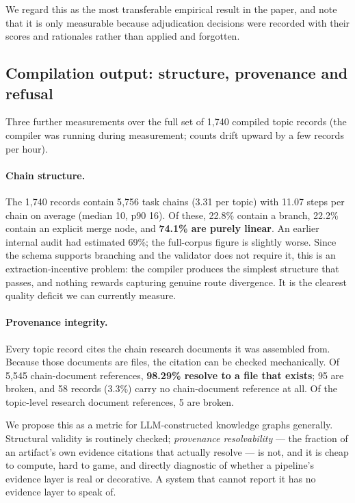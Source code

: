 \documentclass[10pt,a4paper]{article}
\begin{document}
We regard this as the most transferable empirical result in the paper, and note
that it is only measurable because adjudication decisions were recorded with
their scores and rationales rather than applied and forgotten.

\subsection{Compilation output: structure, provenance and refusal}
\label{sec:outputmeasure}

Three further measurements over the full set of 1{,}740 compiled topic records
(the compiler was running during measurement; counts drift upward by a few
records per hour).

\paragraph{Chain structure.} The 1{,}740 records contain 5{,}756 task chains
(3.31 per topic) with 11.07 steps per chain on average (median 10, p90 16). Of
these, 22.8\% contain a branch, 22.2\% contain an explicit merge node, and
\textbf{74.1\% are purely linear}. An earlier internal audit had estimated 69\%;
the full-corpus figure is slightly worse. Since the schema supports branching and
the validator does not require it, this is an extraction-incentive problem: the
compiler produces the simplest structure that passes, and nothing rewards
capturing genuine route divergence. It is the clearest quality deficit we can
currently measure.

\paragraph{Provenance integrity.} Every topic record cites the chain research
documents it was assembled from. Because those documents are files, the citation
can be checked mechanically. Of 5{,}545 chain-document references, \textbf{98.29\%
resolve to a file that exists}; 95 are broken, and 58 records (3.3\%) carry no
chain-document reference at all. Of the topic-level research document references,
5 are broken.

We propose this as a metric for LLM-constructed knowledge graphs generally.
Structural validity is routinely checked; \emph{provenance resolvability} --- the
fraction of an artifact's own evidence citations that actually resolve --- is not,
and it is cheap to compute, hard to game, and directly diagnostic of whether a
pipeline's evidence layer is real or decorative. A system that cannot report it
has no evidence layer to speak of.
\end{document}

